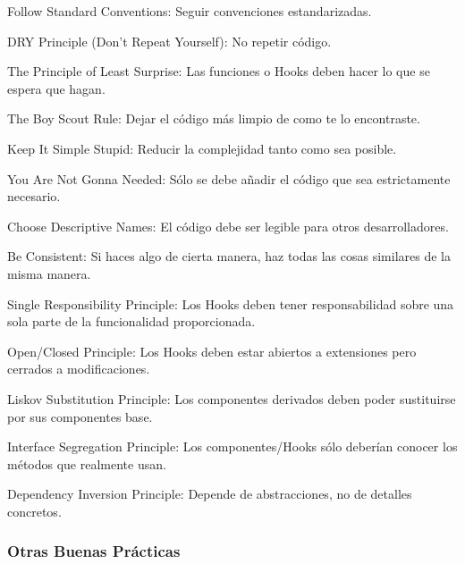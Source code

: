 \documentclass[12pt,twoside,titlepage]{report}
\begin{document}
\begin{compactitem}
    \item Follow Standard Conventions: Seguir convenciones estandarizadas.
    \item DRY Principle (Don't Repeat Yourself): No repetir código.
    \item The Principle of Least Surprise: Las funciones o Hooks deben hacer lo que se espera que hagan.
    \item The Boy Scout Rule: Dejar el código más limpio de como te lo encontraste.
    \item Keep It Simple Stupid: Reducir la complejidad tanto como sea posible.
    \item You Are Not Gonna Needed: Sólo se debe añadir el código que sea estrictamente necesario.
    \item Choose Descriptive Names: El código debe ser legible para otros desarrolladores.
    \item Be Consistent: Si haces algo de cierta manera, haz todas las cosas similares de la misma manera.
    \item Single Responsibility Principle: Los Hooks deben tener responsabilidad sobre una sola parte de la funcionalidad proporcionada.
    \item Open/Closed Principle: Los Hooks deben estar abiertos a extensiones pero cerrados a modificaciones.
    \item Liskov Substitution Principle: Los componentes derivados deben poder sustituirse por sus componentes base.
    \item Interface Segregation Principle: Los componentes/Hooks sólo deberían conocer los métodos que realmente usan.
    \item Dependency Inversion Principle: Depende de abstracciones, no de detalles concretos.
\end{compactitem}

\subsubsection{Otras Buenas Prácticas}
\label{sec:otrasPracticas}
\end{document}
